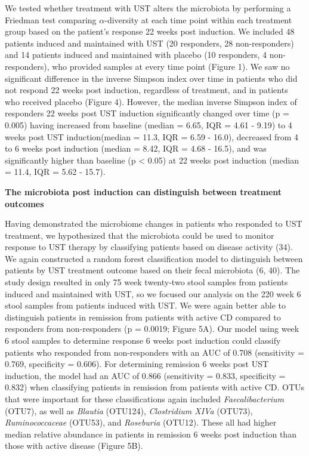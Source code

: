 \documentclass[12pt,]{article}
\begin{document}
We tested whether treatment with UST alters the microbiota by performing
a Friedman test comparing \({\alpha}\)-diversity at each time point
within each treatment group based on the patient's response 22 weeks
post induction. We included 48 patients induced and maintained with UST
(20 responders, 28 non-responders) and 14 patients induced and
maintained with placebo (10 responders, 4 non-responders), who provided
samples at every time point (Figure 1). We saw no significant difference
in the inverse Simpson index over time in patients who did not respond
22 weeks post induction, regardless of treatment, and in patients who
received placebo (Figure 4). However, the median inverse Simpson index
of responders 22 weeks post UST induction significantly changed over
time (p = 0.005) having increased from baseline (median = 6.65, IQR =
4.61 - 9.19) to 4 weeks post UST induction(median = 11.3, IQR = 6.59 -
16.0), decreased from 4 to 6 weeks post induction (median = 8.42, IQR =
4.68 - 16.5), and was significantly higher than baseline (p \textless{}
0.05) at 22 weeks post induction (median = 11.4, IQR = 5.62 - 15.7).

\textbf{The microbiota post induction can distinguish between treatment
outcomes}

Having demonstrated the microbiome changes in patients who responded to
UST treatment, we hypothesized that the microbiota could be used to
monitor response to UST therapy by classifying patients based on disease
activity (34). We again constructed a random forest classification model
to distinguish between patients by UST treatment outcome based on their
fecal microbiota (6, 40). The study design resulted in only 75 week
twenty-two stool samples from patients induced and maintained with UST,
so we focused our analysis on the 220 week 6 stool samples from patients
induced with UST. We were again better able to distinguish patients in
remission from patients with active CD compared to responders from
non-responders (p = 0.0019; Figure 5A). Our model using week 6 stool
samples to determine response 6 weeks post induction could classify
patients who responded from non-responders with an AUC of 0.708
(sensitivity = 0.769, specificity = 0.606). For determining remission 6
weeks post UST induction, the model had an AUC of 0.866 (sensitivity =
0.833, specificity = 0.832) when classifying patients in remission from
patients with active CD. OTUs that were important for these
classifications again included \emph{Faecalibacterium} (OTU7), as well
as \emph{Blautia} (OTU124), \emph{Clostridium XIVa} (OTU73),
\emph{Ruminococcaceae} (OTU53), and \emph{Roseburia} (OTU12). These all
had higher median relative abundance in patients in remission 6 weeks
post induction than those with active disease (Figure 5B).
\end{document}
